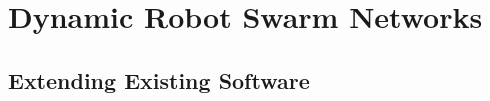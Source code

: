 \chapter{Dynamic Robot Swarm Networks}
\label{chapter5}

	
		
		
    

\section{Extending Existing Software}




